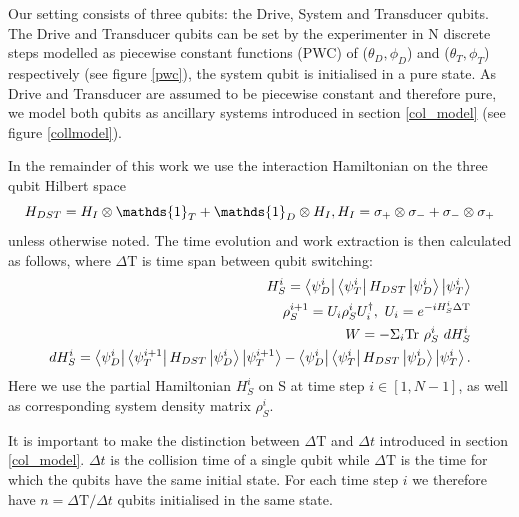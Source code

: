 Our setting consists of three qubits: the Drive, System and Transducer qubits. The Drive and Transducer qubits can be set by the experimenter in N discrete steps modelled as piecewise constant functions (PWC) of ($\theta_D, \phi_D$) and ($\theta_T, \phi_T$) respectively (see figure \ref{pwc}), the system qubit is initialised in a pure state.
As Drive and Transducer are assumed to be piecewise constant and therefore pure, we model both qubits as ancillary systems introduced in section \ref{col_model} (see figure \ref{collmodel}).

In the remainder of this work we use the interaction Hamiltonian on the three qubit Hilbert space
\begin{equation*}
	H_{DST} = H_{I} \otimes \mathds{1}_T + \mathds{1}_D \otimes H_{I}, \\
	H_{I} = \sigma_{+} \otimes \sigma_{-} + \sigma_{-} \otimes \sigma_{+}
\end{equation*}
unless otherwise noted.
The time evolution and work extraction is then calculated as follows, where $\Delta \mathrm{T}$ is time span between qubit switching:
\begin{align}
	H_S^i = \bra{\psi_D^i}\bra{\psi_T^i} H_{DST} \ket{\psi_D^i} \ket{\psi_T^i} \\
	\rho_S^{i+1} = U_i \rho_S^i U^{\dagger}_i, \ U_i = e^{-iH_S^i \Delta \mathrm{T}} \\
	W = - \Sigma_i \mathrm{Tr} \ \rho_S^i \ dH_S^i \\
	dH_S^i = \bra{\psi_D^i}\bra{\psi_T^{i+1}} H_{DST} \ket{\psi_D^i} \ket{\psi_T^{i+1}} - \bra{\psi_D^i}\bra{\psi_T^i} H_{DST} \ket{\psi_D^i} \ket{\psi_T^i}.	
\end{align}
Here we use the partial Hamiltonian $H_S^i$ on S at time step $i \in [1, N - 1]$, as well as corresponding system density matrix $\rho_S^i$.

It is important to make the distinction between $\Delta \mathrm{T}$ and $\Delta t$ introduced in section \ref{col_model}. $\Delta t$ is the collision time of a single qubit while $\Delta \mathrm{T}$ is the time for which the qubits have the same initial state. For each time step $i$ we therefore have $n = \Delta \mathrm{T} / \Delta t$ qubits initialised in the same state.



